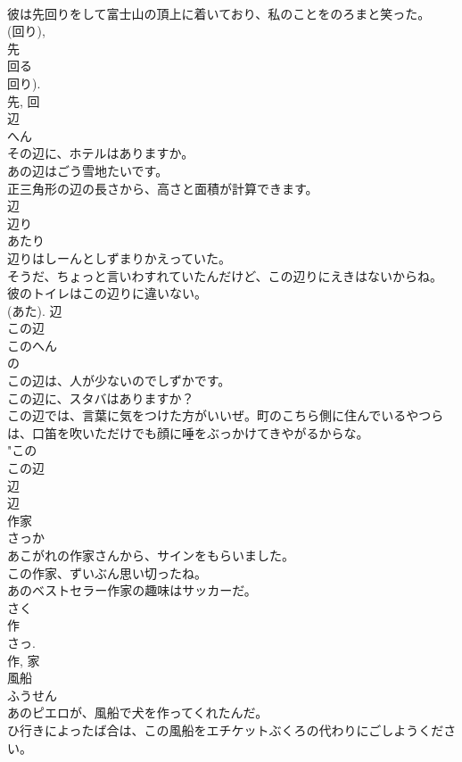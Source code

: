 \documentclass[8pt]{extreport}
\begin{document}
\begin{CJK}{UTF8}{min}
\\	彼は先回りをして富士山の頂上に着いており、私のことをのろまと笑った。	
\\	(回り), 
\\	先 
\\	回る 
\\	回り). 
\\	先, 回	
\\	辺	
\\	へん	
\\	その辺に、ホテルはありますか。	
\\	あの辺はごう雪地たいです。	
\\	正三角形の辺の長さから、高さと面積が計算できます。	
\\	辺	
\\	辺り	
\\	あたり	
\\	辺りはしーんとしずまりかえっていた。	
\\	そうだ、ちょっと言いわすれていたんだけど、この辺りにえきはないからね。	
\\	彼のトイレはこの辺りに違いない。	
\\	(あた).	辺	
\\	この辺	
\\	このへん	
\\	の 
\\	この辺は、人が少ないのでしずかです。	
\\	この辺に、スタバはありますか？	
\\	この辺では、言葉に気をつけた方がいいぜ。町のこちら側に住んでいるやつらは、口笛を吹いただけでも顔に唾をぶっかけてきやがるからな。	
\\	"この 
\\	この辺 
\\	辺 
\\	辺	
\\	作家	
\\	さっか	
\\	あこがれの作家さんから、サインをもらいました。	
\\	この作家、ずいぶん思い切ったね。	
\\	あのベストセラー作家の趣味はサッカーだ。	
\\	さく 
\\	作 
\\	さっ. 
\\	作, 家	
\\	風船	
\\	ふうせん	
\\	あのピエロが、風船で犬を作ってくれたんだ。	
\\	ひ行きによったば合は、この風船をエチケットぶくろの代わりにごしようください。	

\end{CJK}
\end{document}
